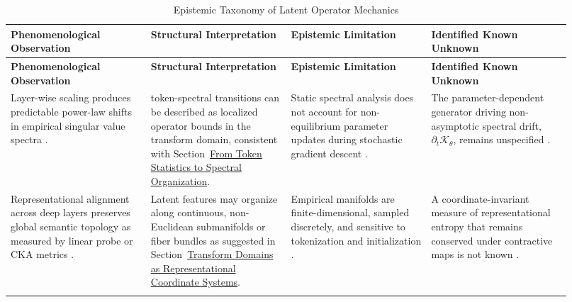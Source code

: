 \clearpage 
\small     
\begin{longtable}{>{\RaggedRight}p{0.23\linewidth} >{\RaggedRight}p{0.23\linewidth} >{\RaggedRight}p{0.23\linewidth} >{\RaggedRight}p{0.23\linewidth}}
\caption{Epistemic Taxonomy of Latent Operator Mechanics\label{tab:epistemic_matrix_exploring}} \\
\toprule
\textbf{Phenomenological Observation} & 
\textbf{Structural Interpretation} & 
\textbf{Epistemic Limitation} & 
\textbf{Identified Known Unknown} \\ 
\midrule
\endfirsthead %

\toprule
\textbf{Phenomenological Observation} & 
\textbf{Structural Interpretation} & 
\textbf{Epistemic Limitation} & 
\textbf{Identified Known Unknown} \\ 
\midrule
\endhead %

Layer-wise scaling produces predictable power-law shifts in empirical singular value spectra \cite{martin2017rethinking, martin2021implicit}. 
& token-spectral transitions can be described as localized operator bounds in the transform domain, consistent with Section~\hyperlink{appx:token-spectral}{From Token Statistics to Spectral Organization}. 
& Static spectral analysis does not account for non-equilibrium parameter updates during stochastic gradient descent \cite{pennington2017nonlinear}. 
& The parameter-dependent generator driving non-asymptotic spectral drift, $\partial_t \mathcal{K}_\theta$, remains unspecified \cite{jastrzebski2020break}. \\ 
\addlinespace

Representational alignment across deep layers preserves global semantic topology as measured by linear probe or CKA metrics \cite{kornblith2019similarity, raghu2021vision}. 
& Latent features may organize along continuous, non-Euclidean submanifolds or fiber bundles as suggested in Section~\hyperlink{sec:transform_domains}{Transform Domains as Representational Coordinate Systems}. 
& Empirical manifolds are finite-dimensional, sampled discretely, and sensitive to tokenization and initialization \cite{anselmi2019intrinsic}. 
& A coordinate-invariant measure of representational entropy that remains conserved under contractive maps is not known \cite{baez2011category}. \\ 
\addlinespace


\end{longtable}

